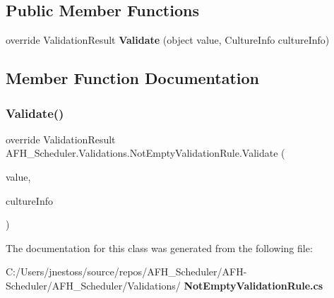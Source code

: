 \subsection*{Public Member Functions}
\begin{DoxyCompactItemize}
\item 
override Validation\+Result \textbf{ Validate} (object value, Culture\+Info culture\+Info)
\end{DoxyCompactItemize}


\subsection{Member Function Documentation}
\mbox{\label{class_a_f_h___scheduler_1_1_validations_1_1_not_empty_validation_rule_ae13e2084a19fa17d30ca542b0f2046c3}} 
\subsubsection{Validate()}
{\footnotesize\ttfamily override Validation\+Result A\+F\+H\+\_\+\+Scheduler.\+Validations.\+Not\+Empty\+Validation\+Rule.\+Validate (\begin{DoxyParamCaption}\item[{object}]{value,  }\item[{Culture\+Info}]{culture\+Info }\end{DoxyParamCaption})}



The documentation for this class was generated from the following file\+:\begin{DoxyCompactItemize}
\item 
C\+:/\+Users/jnestoss/source/repos/\+A\+F\+H\+\_\+\+Scheduler/\+A\+F\+H-\/\+Scheduler/\+A\+F\+H\+\_\+\+Scheduler/\+Validations/\textbf{ Not\+Empty\+Validation\+Rule.\+cs}\end{DoxyCompactItemize}
